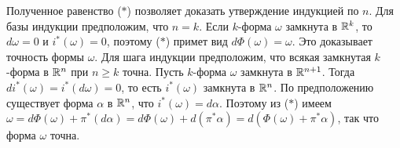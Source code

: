 \begin{myproof}
	\vspace{5pt}
    Полученное равенство ($*$) позволяет доказать утверждение индукцией по $n$. Для базы индукции предположим, что $n=k$. Если $k$-форма $\omega$ замкнута в $\mathbb{R}^k$,
	то $d\omega = 0$ и $i^*(\omega) = 0$, поэтому ($*$) примет вид $d\Phi(\omega) = \omega$. Это доказывает точность формы $\omega$. 
	Для шага индукции предположим, что всякая замкнутая $k$-форма в $\mathbb{R}^n$ при $n \ge k$ точна. Пусть $k$-форма $\omega$ замкнута в $\mathbb{R}^{n+1}$. 
	Тогда $di^*(\omega) = i^*(d\omega) = 0$, то есть $i^*(\omega)$ замкнута в $\mathbb{R}^n$. По предположению существует форма $\alpha$ в $\mathbb{R}^n$, что $i^*(\omega) = d\alpha$. Поэтому из ($*$) имеем $\omega = d\Phi(\omega) + \pi^*(d\alpha) = d\Phi(\omega) + d(\pi^*\alpha) = d(\Phi(\omega) + \pi^*\alpha)$, так что форма $\omega$ точна.
\end{myproof}